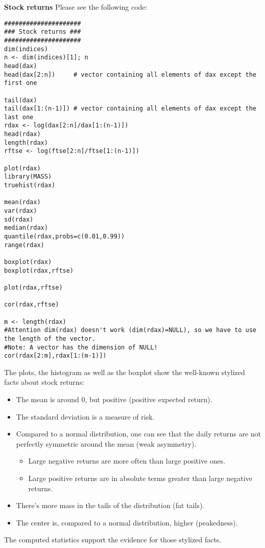 \documentclass{article}
\begin{document}
\begin{solution}
\textbf{Stock returns}
Please see the following code:
\begin{verbatim}
#####################
### Stock returns ###
#####################
dim(indices)
n <- dim(indices)[1]; n
head(dax)
head(dax[2:n])     # vector containing all elements of dax except the first one

tail(dax)
tail(dax[1:(n-1)]) # vector containing all elements of dax except the last one
rdax <- log(dax[2:n]/dax[1:(n-1)])
head(rdax)
length(rdax)
rftse <- log(ftse[2:n]/ftse[1:(n-1)])
	
plot(rdax)
library(MASS)
truehist(rdax)
	
mean(rdax)
var(rdax)
sd(rdax)
median(rdax)
quantile(rdax,probs=c(0.01,0.99))
range(rdax)
	
boxplot(rdax)
boxplot(rdax,rftse)

plot(rdax,rftse)
	
cor(rdax,rftse)

m <- length(rdax)
#Attention dim(rdax) doesn't work (dim(rdax)=NULL), so we have to use the length of the vector.
#Note: A vector has the dimension of NULL!
cor(rdax[2:m],rdax[1:(m-1)])
\end{verbatim}

  The plots, the histogram as well as the boxplot show the well-known stylized facts about stock returns:
  \begin{itemize}
  \item The mean is around 0, but positive (positive expected return).
  \item The standard deviation is a measure of risk.
  \item Compared to a normal distribution, one can see that the daily returns are not perfectly symmetric around the mean (weak asymmetry).
  \begin{itemize}
  \item Large negative returns are more often than large positive ones.
  \item Large positive returns are in absolute terms greater than large negative returns.
  \end{itemize}
  \item There's more mass in the tails of the distribution (fat tails).
  \item The center is, compared to a normal distribution, higher (peakedness).
  \end{itemize}
  \item The computed statistics support the evidence for those stylized facts.
\end{solution}
\end{document}
